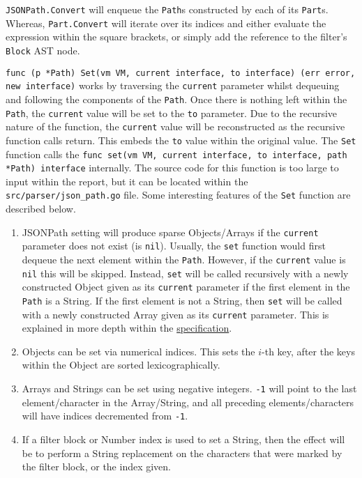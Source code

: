 \inputminted[firstline=533, lastline=585, autogobble, breaklines, tabsize=4]{go}{../../src/parser/json_path.go}

\verb|JSONPath.Convert| will enqueue the \verb|Path|s constructed by each of its \verb|Part|s. Whereas, \verb|Part.Convert| will iterate over its indices and either evaluate the expression within the square brackets, or simply add the reference to the filter's \verb|Block| AST node.

\texttt{func (p *Path) Set(vm VM, current interface{}, to interface{}) (err error, new interface{})} works by traversing the \verb|current| parameter whilst dequeuing and following the components of the \verb|Path|. Once there is nothing left within the \verb|Path|, the \verb|current| value will be set to the \verb|to| parameter. Due to the recursive nature of the function, the \verb|current| value will be reconstructed as the recursive function calls return. This embeds the \verb|to| value within the original value. The \verb|Set| function calls the \texttt{func set(vm VM, current interface{}, to interface{}, path *Path) interface{}} internally. The source code for this function is too large to input within the report, but it can be located within the \verb|src/parser/json_path.go| file. Some interesting features of the \verb|Set| function are described below.

\begin{enumerate}
    \item JSONPath setting will produce sparse Objects/Arrays if the \verb|current| parameter does not exist (is \verb|nil|). Usually, the \verb|set| function would first dequeue the next element within the \verb|Path|. However, if the \verb|current| value is \verb|nil| this will be skipped. Instead, \verb|set| will be called recursively with a newly constructed Object given as its \verb|current| parameter if the first element in the \verb|Path| is a String. If the first element is not a String, then \verb|set| will be called with a newly constructed Array given as its \verb|current| parameter. This is explained in more depth within the \hyperref[sec:jsonpath-setting]{specification}.
    \item Objects can be set via numerical indices. This sets the $i$-th key, after the keys within the Object are sorted lexicographically.
    \item Arrays and Strings can be set using negative integers. \verb|-1| will point to the last element/character in the Array/String, and all preceding elements/characters will have indices decremented from \verb|-1|.
    \item If a filter block or Number index is used to set a String, then the effect will be to perform a String replacement on the characters that were marked by the filter block, or the index given.
\end{enumerate}

